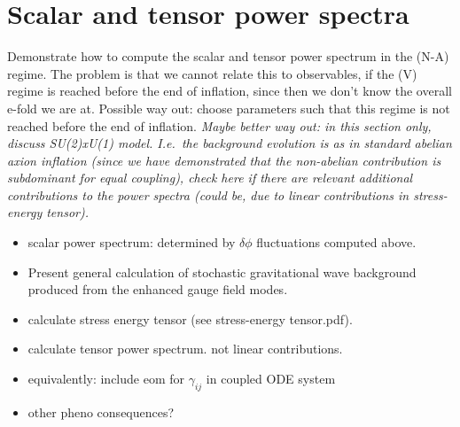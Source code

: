 \section{Scalar and tensor power spectra}




Demonstrate how to compute the scalar and tensor power spectrum in the (N-A) regime. The problem is that we cannot relate this to observables, if the (V) regime is reached before the end of inflation, since then we don't know the overall e-fold we are at. Possible way out: choose parameters such that this regime is not reached before the end of inflation. \textit{Maybe better way out: in this section only, discuss SU(2)xU(1) model. I.e.\ the background evolution is as in standard abelian axion inflation (since we have demonstrated that the non-abelian contribution is subdominant for equal coupling), check here if there are relevant additional contributions to the power spectra (could be, due to linear contributions in stress-energy tensor).}
\begin{itemize}
\item scalar power spectrum: determined by $\delta \phi$ fluctuations computed above.
 \item Present general calculation of stochastic gravitational wave background produced from the enhanced gauge field modes.
 \item calculate stress energy tensor (see stress-energy tensor.pdf). 
 \item calculate tensor power spectrum. not linear contributions.
 \item equivalently: include eom for $\gamma_{ij}$ in coupled ODE system
 \item other pheno consequences?
\end{itemize}